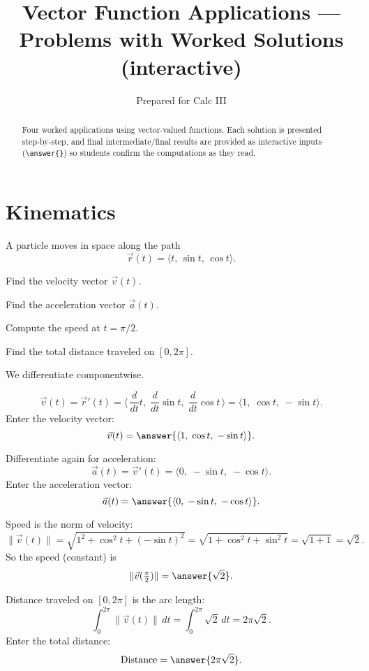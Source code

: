 \documentclass{ximera}
\title{Vector Function Applications — Problems with Worked Solutions (interactive)}
\author{Prepared for Calc III}
\begin{document}
\begin{abstract}
Four worked applications using vector-valued functions. Each solution is presented step-by-step, and final intermediate/final results are provided as interactive inputs (\texttt{\textbackslash answer\{\}}) so students confirm the computations as they read.
\end{abstract}

\maketitle

\section{Kinematics}

\begin{problem}
A particle moves in space along the path
\[
\vec{r}(t) = \langle t,\, \sin t,\, \cos t\rangle.
\]

Find the velocity vector $\vec{v}(t)$.

Find the acceleration vector $\vec{a}(t)$.

Compute the speed at $t=\pi/2$.

Find the total distance traveled on $[0,2\pi]$.
\end{problem}

\begin{solution}
We differentiate componentwise.

\[
\vec{v}(t)=\vec r'(t)
= \langle \,\frac{d}{dt}t,\; \frac{d}{dt}\sin t,\; \frac{d}{dt}\cos t \,\rangle
= \langle 1,\; \cos t,\; -\sin t\rangle.
\]
Enter the velocity vector:
\[
\vec{v}(t)=\answer{\langle 1,\;\cos t,\; -\sin t\rangle}.
\]

Differentiate again for acceleration:
\[
\vec{a}(t)=\vec v'(t)=\langle 0,\; -\sin t,\; -\cos t\rangle.
\]
Enter the acceleration vector:
\[
\vec{a}(t)=\answer{\langle 0,\; -\sin t,\; -\cos t\rangle}.
\]

Speed is the norm of velocity:
\[
\|\vec v(t)\|=\sqrt{1^2+\cos^2 t+(-\sin t)^2}
=\sqrt{1+\cos^2 t+\sin^2 t}=\sqrt{1+1}=\sqrt{2}.
\]
So the speed (constant) is
\[
\|\vec v(\tfrac{\pi}{2})\|=\answer{\sqrt{2}}.
\]

Distance traveled on $[0,2\pi]$ is the arc length:
\[
\int_0^{2\pi} \|\vec v(t)\|\,dt = \int_0^{2\pi} \sqrt{2}\,dt
= 2\pi\sqrt{2}.
\]
Enter the total distance:
\[
\text{Distance}=\answer{2\pi\sqrt{2}}.
\]

\bigskip
\begin{multipleChoice}
\end{multipleChoice}
\end{solution}
\end{document}
